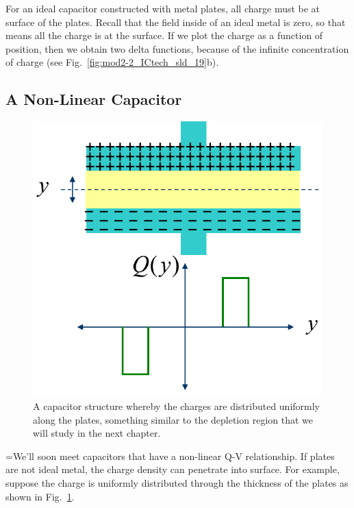 For an ideal capacitor constructed with metal plates, all charge must be at surface of the plates.  Recall that the field inside of an ideal metal is zero, so that means all the charge is at the surface.  If we plot the charge as a function of position, then we obtain two delta functions, because of the infinite concentration of charge (see Fig.~\ref{fig:mod2-2_ICtech_sld_19}b).
\subsection{A Non-Linear Capacitor}
\begin{figure}[tb]
\begin{center}
\includegraphics[width=.5\columnwidth]{mod2-2_ICtech_sld_20b} 
\end{center}
\caption{A capacitor structure whereby the charges are distributed uniformly along the plates, something similar to the depletion region that we will study in the next chapter.} \label{fig:mod2-2_ICtech_sld_20b}
\end{figure}

=We’ll soon meet capacitors that have a non-linear Q-V relationship.  
 If plates are not ideal metal, the charge density can penetrate into surface.  For example, suppose the charge is uniformly distributed through the thickness of the plates as shown in Fig.~\ref{fig:mod2-2_ICtech_sld_20b}.
 
